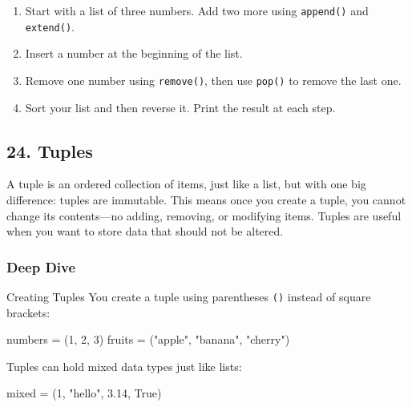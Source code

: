 \documentclass[
  letterpaper,
  DIV=11,
  numbers=noendperiod]{scrreprt}
\newenvironment{Shaded}{\begin{snugshade}}{\end{snugshade}}
\newcommand{\DecValTok}[1]{\textcolor[rgb]{0.68,0.00,0.00}{#1}}
\newcommand{\FloatTok}[1]{\textcolor[rgb]{0.68,0.00,0.00}{#1}}
\newcommand{\NormalTok}[1]{\textcolor[rgb]{0.00,0.23,0.31}{#1}}
\newcommand{\OperatorTok}[1]{\textcolor[rgb]{0.37,0.37,0.37}{#1}}
\newcommand{\StringTok}[1]{\textcolor[rgb]{0.13,0.47,0.30}{#1}}
\newcommand{\VariableTok}[1]{\textcolor[rgb]{0.07,0.07,0.07}{#1}}
\providecommand{\tightlist}{%
  \setlength{\itemsep}{0pt}\setlength{\parskip}{0pt}}
\begin{document}
\begin{enumerate}
\def\labelenumi{\arabic{enumi}.}
\tightlist
\item
  Start with a list of three numbers. Add two more using
  \texttt{append()} and \texttt{extend()}.
\item
  Insert a number at the beginning of the list.
\item
  Remove one number using \texttt{remove()}, then use \texttt{pop()} to
  remove the last one.
\item
  Sort your list and then reverse it. Print the result at each step.
\end{enumerate}

\subsection{24. Tuples}\label{tuples}

A tuple is an ordered collection of items, just like a list, but with
one big difference: tuples are immutable. This means once you create a
tuple, you cannot change its contents---no adding, removing, or
modifying items. Tuples are useful when you want to store data that
should not be altered.

\subsubsection{Deep Dive}\label{deep-dive-24}

Creating Tuples You create a tuple using parentheses \texttt{()} instead
of square brackets:

\begin{Shaded}
\begin{Highlighting}[]
\NormalTok{numbers }\OperatorTok{=}\NormalTok{ (}\DecValTok{1}\NormalTok{, }\DecValTok{2}\NormalTok{, }\DecValTok{3}\NormalTok{)}
\NormalTok{fruits }\OperatorTok{=}\NormalTok{ (}\StringTok{"apple"}\NormalTok{, }\StringTok{"banana"}\NormalTok{, }\StringTok{"cherry"}\NormalTok{)}
\end{Highlighting}
\end{Shaded}

Tuples can hold mixed data types just like lists:

\begin{Shaded}
\begin{Highlighting}[]
\NormalTok{mixed }\OperatorTok{=}\NormalTok{ (}\DecValTok{1}\NormalTok{, }\StringTok{"hello"}\NormalTok{, }\FloatTok{3.14}\NormalTok{, }\VariableTok{True}\NormalTok{)}
\end{Highlighting}
\end{Shaded}
\end{document}

